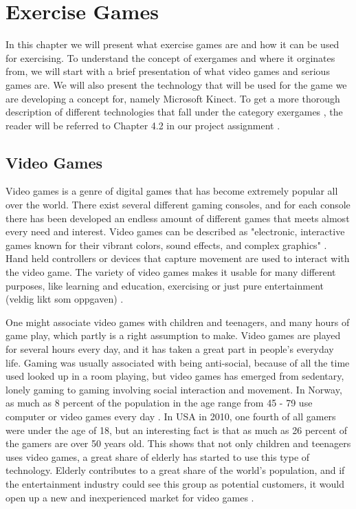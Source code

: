 \chapter{Exercise Games}
In this chapter we will present what exercise games are and how it can be used for exercising. To understand the concept of exergames and where it orginates from, we will start with a brief presentation of what video games and serious games are. We will also present the technology that will be used for the game we are developing a concept for, namely Microsoft Kinect. To get a more thorough description of different technologies that fall under the category exergames , the reader will be referred to Chapter 4.2 in our project assignment \cite{project}.

\section{Video Games}

Video games is a genre of digital games that has become extremely popular all over the world. There exist several different gaming consoles, and for each console there has been developed an endless amount of different games that meets almost every need and interest. Video games can be described as "electronic, interactive games known for their vibrant colors, sound effects, and complex graphics" \cite{videogamedef}. Hand held controllers or devices that capture movement are used to interact with the video game. The variety of video games makes it usable for many different purposes, like learning and education, exercising or just pure entertainment (veldig likt som oppgaven) \cite{project}. 

One might associate video games with children and teenagers, and many hours of game play, which partly is a right assumption to make. Video games are played for several hours every day, and it has taken a great part in people's everyday life. Gaming was usually associated with being anti-social, because of all the time used looked up in a room playing, but video games has emerged from sedentary, lonely gaming to gaming involving social interaction and movement. In Norway,  as much as 8 percent of the population in the age range from 45 - 79 use computer or video games every day \cite{project}. In USA in 2010, one fourth of all gamers were under the age of 18, but an interesting fact is that as much as 26 percent of the gamers are over 50 years old. This shows that not only children and teenagers uses video games, a great share of elderly has started to use this type of technology. Elderly contributes to a great share of the world's population, and if the entertainment industry could see this group as potential customers, it would open up a new and inexperienced market for video games \cite{ijsselsteijn2007digital}. 

